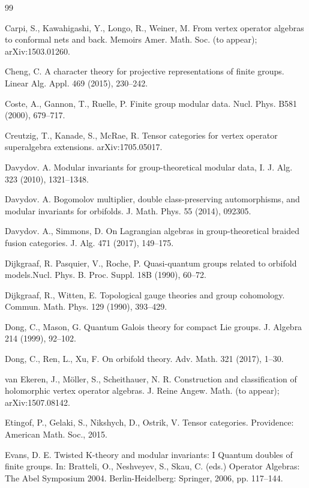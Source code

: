 \documentclass[12pt]{article}
\numberwithin{equation}{section}
\begin{document}
\begin{thebibliography}{99}
\begin{scriptsize}
 {Carpi, S., Kawahigashi, Y.,  Longo, R.,  Weiner, M.} {From vertex operator algebras to conformal nets and back.} Memoirs Amer. Math. Soc. (to appear); arXiv:1503.01260. 



 {Cheng, C.} {A character theory for projective representations of finite groups.} {Linear Alg. Appl.} {469} (2015), 230--242.


 {Coste, A., Gannon, T., Ruelle, P.} {Finite group modular data.}
Nucl. Phys. B581 (2000), 679--717.


 {Creutzig, T., Kanade, S.,  McRae, R.} {Tensor categories for vertex operator superalgebra extensions.} arXiv:1705.05017.


 {Davydov. A.} {Modular invariants for group-theoretical modular data, I.} J. Alg. 323 (2010), 1321--1348.

 {Davydov. A.} {Bogomolov multiplier, double class-preserving automorphisms, and modular invariants for orbifolds.} {J. Math. Phys.} {55} (2014), 092305.

 {Davydov. A., Simmons, D.} {On Lagrangian algebras in group-theoretical braided fusion categories.} J. Alg. 471 (2017), 149--175. %


 {Dijkgraaf, R. Pasquier, V., Roche, P.} {Quasi-quantum groups related to orbifold models.}Nucl.
Phys. B. Proc. Suppl. 18B (1990), 60--72.

 {Dijkgraaf, R., Witten, E.}  {Topological gauge theories and group cohomology.} {Commun. Math.
Phys.} 129 (1990), 393--429.


 {Dong, C., Mason, G.} {Quantum Galois theory for compact Lie groups.}
{J. Algebra} {214} (1999), 92--102. 

 {Dong, C.,  Ren,  L., Xu, F.} {On orbifold theory.}  {Adv. Math.}
{321} (2017), 1--30.%


 {van Ekeren, J., M\"oller, S., Scheithauer, N. R.} {Construction and classification of holomorphic vertex operator algebras.}  {J. Reine Angew. Math.} (to appear); arXiv:1507.08142.



 {Etingof, P., Gelaki, S., Nikshych, D., Ostrik, V.} {Tensor categories.} Providence: American Math. Soc., 2015.



 {Evans, D. E.} {Twisted K-theory and modular invariants: I Quantum
doubles of finite groups.} In: Bratteli, O., Neshveyev, S., Skau, C. (eds.)
Operator Algebras: The Abel Symposium 2004. Berlin-Heidelberg: Springer, 2006,
pp. 117--144.


\end{scriptsize}
\end{thebibliography}
\end{document}
